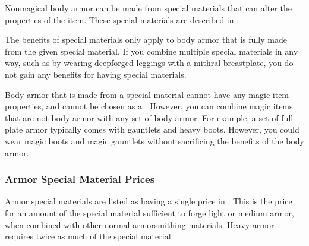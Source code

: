     Nonmagical body armor can be made from special materials that can alter the properties of the item.
    These special materials are described in .

    The benefits of special materials only apply to body armor that is fully made from the given special material.
    If you combine multiple special materials in any way, such as by wearing deepforged leggings with a mithral breastplate, you do not gain any benefits for having special materials.

    Body armor that is made from a special material cannot have any magic item properties, and cannot be chosen as a .
    However, you can combine magic items that are not body armor with any set of body armor.
    For example, a set of full plate armor typically comes with gauntlets and heavy boots.
    However, you could wear magic boots and magic gauntlets without sacrificing the benefits of the body armor.

    \subsubsection{Armor Special Material Prices}
      Armor special materials are listed as having a single price in .
      This is the price for an amount of the special material sufficient to forge light or medium armor, when combined with other normal armorsmithing materials.
      Heavy armor requires twice as much of the special material.

